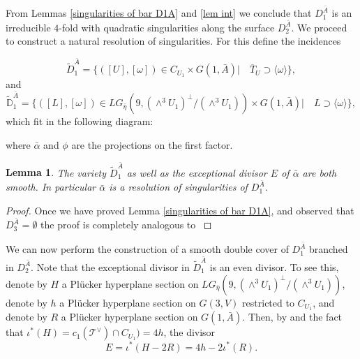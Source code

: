 \documentclass[a4paper,11pt]{amsart}
\newtheorem{lem}[thm]{Lemma}
\theoremstyle{definition}
\numberwithin{equation}{section}
\numberwithin{equation}{section} \theoremstyle{definition}
\begin{document}
From Lemmas \ref{singularities of bar D1A} and \ref{lem int} we conclude that $D_1^{\bar{A}}$ is an irreducible $4$-fold  with quadratic singularities along the surface $D_2^{\bar A}$.   We proceed to construct a natural resolution of singularities.
For this define the incidences 
 
\[
 \tilde{D}_1^{\bar{A}}=\{([U],[\omega])\in C_{U_1}\times G(1,\bar{A})| \quad \overline{T}_U \supset \langle \omega\rangle\},
 \]
 and 
 \[\textstyle 
 \tilde{\mathbb{D}}_1^{\bar{A}}=\{([L],[\omega])\in LG_{\bar{\eta}}(9,(\wedge^3 U_1)^{\perp}/(\wedge^3 U_1))\times G(1,\bar{A})| \quad L \supset \langle\omega\rangle\},
 \]
which fit in the following diagram:
\begin{center}
\end{center}
 where $\bar{\alpha}$ and $\phi$ are the projections on the first factor.
 \begin{lem} The variety $\tilde {D}_1^{\bar{A}}$ as well as the exceptional divisor $E$ of $\bar{\alpha}$ are both smooth. In particular $\bar{\alpha}$ is a resolution of singularities of $ D_1^{\bar{A}}   $.
 \end{lem}
 \medskip
 \begin{proof} Once we have proved Lemma \ref{singularities of bar D1A}, and observed that $D_3^{\bar{A}}=\emptyset$ the proof is completely analogous to \cite[Lemma 3.3]{EPWcubes}
 \end{proof}
 We can now perform the construction of a smooth double cover of $D_1^{\bar{A}}$ branched in $D_2^{\bar{A}}$. Note that the exceptional divisor in
 $\tilde {D}_1^{\bar{A}}$ is an even divisor.  To see this,  denote by $H$ a Pl\"ucker hyperplane section on  $LG_{\bar{\eta}}(9,(\wedge^3 U_1)^{\perp}/(\wedge^3 U_1))$, denote by $h$  a Pl\"ucker hyperplane section on $G(3,V)$ restricted to $C_{U_1}$, and denote by $R$ a Pl\"ucker hyperplane section on $G(1,\bar{A})$.  Then, by  \cite[Lemma 2.4]{EPWcubes} and the fact that $\iota^*(H)=c_1({\mathcal T}^{\vee})\cap {C_{U_1}})=4h$, the divisor
 $$E=\iota^*(H-2R)=4h-2\iota^*(R).$$
\end{document}
